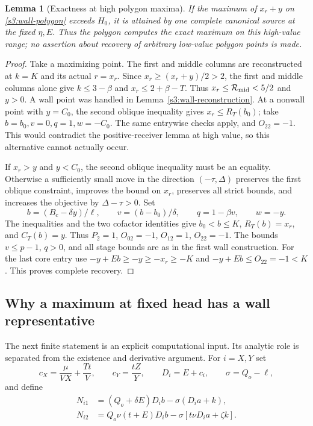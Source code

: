 \documentclass[11pt,reqno]{amsart}
\newtheorem{lemma}[theorem]{Lemma}
\theoremstyle{definition}
\theoremstyle{remark}
\begin{document}
\begin{lemma}[Exactness at high polygon maxima]
\label{s3:wall-polygon-maximum}
If the maximum of \(x_r+y\) on \eqref{s3:wall-polygon} exceeds
\(H_0\), it is attained by one complete canonical source at the
fixed \(\eta,E\). Thus the polygon computes the exact maximum
on this high-value range; no assertion about recovery of arbitrary
low-value polygon points is made.
\end{lemma}
\begin{proof}
Take a maximizing point. The first and middle columns are reconstructed
at \(k=K\) and its actual \(r=x_r\). Since \(x_r\ge(x_r+y)/2>2\), the first and middle
columns alone give \(k\le3-\beta\) and
\(x_r\le2+\beta-T\). Thus
\(x_r\le\mathcal R_{\rm mid}<5/2\) and \(y>0\). A wall point was handled in
Lemma~\ref{s3:wall-reconstruction}. At a nonwall point with \(y=C_0\),
the second oblique inequality gives \(x_r\le R_T(b_0)\);
take \(b=b_0,v=0,q=1,w=-C_0\). The same entrywise checks apply,
and \(O_{22}=-1\). This would contradict the positive-receiver
lemma at high value, so this alternative cannot actually occur.

If \(x_r>y\) and \(y<C_0\), the second oblique inequality
must be an equality. Otherwise a sufficiently small move in the
direction \((-\tau,\Delta)\) preserves the first oblique constraint,
improves the bound on \(x_r\), preserves all strict bounds, and
increases the objective by \(\Delta-\tau>0\).
Set
\[
 b=(B_c-\delta y)/\ell,\qquad
 v=(b-b_0)/\delta,\qquad q=1-\beta v,\qquad w=-y.
\]
The inequalities and the two cofactor identities give
\(b_0<b\le K\), \(R_T(b)=x_r\), and \(C_T(b)=y\).
Thus \(P_2=1\), \(O_{02}=-1\), \(O_{12}=1\),
\(O_{22}=-1\). The bounds \(v\le p-1\), \(q>0\),
and all stage bounds are as in the first wall construction.
For the last core entry use \(-y+Eb\ge-y\ge-x_r\ge-K\)
and \(-y+Eb\le O_{22}=-1<K\). This proves complete recovery.
\end{proof}

\subsection{Why a maximum at fixed head has a wall representative}
\label{s3:wall-global-representative}

The next finite statement is an explicit computational input. Its
analytic role is separated from the existence and derivative argument.
For \(i=X,Y\) set
\[
 c_X=\frac\mu{VX}+\frac{Tt}{V},\qquad c_Y=\frac{tZ}{Y},\qquad
 D_i=E+c_i,\qquad\sigma=Q_o-\ell,
\]
and define
\begin{equation}\label{s3:wall-nonwall-numerators}
\begin{split}
 N_{i1}&=(Q_o+\delta E)D_i b-\sigma(D_i a+k),\\
 N_{i2}&=Q_o\nu(t+E)D_i b
           -\sigma[t\nu D_i a+\zeta k].
\end{split}
\end{equation}
\end{document}
